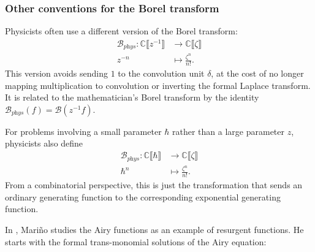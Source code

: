 \documentclass{article}
\newcommand{\maps}{\colon}
\newcommand{\C}{\mathbb{C}}
\newcommand{\borel}{\mathcal{B}}
\theoremstyle{definition}
\theoremstyle{plain}
\begin{document}
\subsubsection{Other conventions for the Borel transform}
%
Physicists often use a different version of the Borel transform:
\begin{align*}
\borel_{\textit{phys}} \maps \C \llbracket z^{-1} \rrbracket & \to \C \llbracket \zeta \rrbracket \\
z^{-n} & \mapsto \frac{\zeta^n}{n!}.
\end{align*}
This version avoids sending $1$ to the convolution unit $\delta$, at the cost of no longer mapping multiplication to convolution or inverting the formal Laplace transform. It is related to the mathematician's Borel transform by the identity $\borel_\textit{phys}(f) = \borel(z^{-1} f)$.

For problems involving a small parameter $\hbar$ rather than a large parameter $z$, physicists also define
\begin{align*}
\borel_{\textit{phys}} \maps \C \llbracket \hbar \rrbracket & \to \C \llbracket \zeta \rrbracket \\
\hbar^n & \mapsto \frac{\zeta^n}{n!}.
\end{align*}
From a combinatorial perspective, this is just the transformation that sends an ordinary generating function to the corresponding exponential generating function.

In \cite{lectures-Marino}, Mari\~{n}o studies the Airy functions as an example of resurgent functions. He starts with the formal trans-monomial solutions of the Airy equation:
\end{document}
